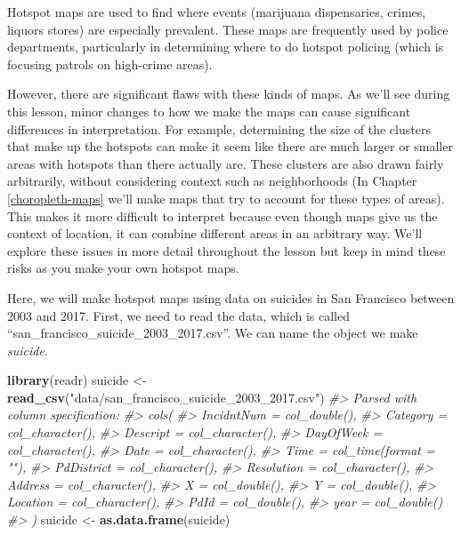 \documentclass[
  12pt,
]{book}
\newenvironment{Shaded}{\begin{snugshade}}{\end{snugshade}}
\newcommand{\CommentTok}[1]{\textcolor[rgb]{0.37,0.37,0.37}{\textit{#1}}}
\newcommand{\KeywordTok}[1]{\textcolor[rgb]{0.27,0.27,0.27}{\textbf{#1}}}
\newcommand{\NormalTok}[1]{#1}
\newcommand{\StringTok}[1]{\textcolor[rgb]{0.5,0.5,0.5}{#1}}
\begin{document}
Hotspot maps are used to find where events (marijuana dispensaries, crimes, liquors stores) are especially prevalent. These maps are frequently used by police departments, particularly in determining where to do hotspot policing (which is focusing patrols on high-crime areas).

However, there are significant flaws with these kinds of maps. As we'll see during this lesson, minor changes to how we make the maps can cause significant differences in interpretation. For example, determining the size of the clusters that make up the hotspots can make it seem like there are much larger or smaller areas with hotspots than there actually are. These clusters are also drawn fairly arbitrarily, without considering context such as neighborhoods (In Chapter \ref{choropleth-maps} we'll make maps that try to account for these types of areas). This makes it more difficult to interpret because even though maps give us the context of location, it can combine different areas in an arbitrary way. We'll explore these issues in more detail throughout the lesson but keep in mind these risks as you make your own hotspot maps.

Here, we will make hotspot maps using data on suicides in San Francisco between 2003 and 2017. First, we need to read the data, which is called ``san\_francisco\_suicide\_2003\_2017.csv''. We can name the object we make \emph{suicide}.

\begin{Shaded}
\begin{Highlighting}[]
\KeywordTok{library}\NormalTok{(readr)}
\NormalTok{suicide <{-}}\StringTok{ }\KeywordTok{read\_csv}\NormalTok{(}\StringTok{"data/san\_francisco\_suicide\_2003\_2017.csv"}\NormalTok{)}
\CommentTok{\#> Parsed with column specification:}
\CommentTok{\#> cols(}
\CommentTok{\#>   IncidntNum = col\_double(),}
\CommentTok{\#>   Category = col\_character(),}
\CommentTok{\#>   Descript = col\_character(),}
\CommentTok{\#>   DayOfWeek = col\_character(),}
\CommentTok{\#>   Date = col\_character(),}
\CommentTok{\#>   Time = col\_time(format = ""),}
\CommentTok{\#>   PdDistrict = col\_character(),}
\CommentTok{\#>   Resolution = col\_character(),}
\CommentTok{\#>   Address = col\_character(),}
\CommentTok{\#>   X = col\_double(),}
\CommentTok{\#>   Y = col\_double(),}
\CommentTok{\#>   Location = col\_character(),}
\CommentTok{\#>   PdId = col\_double(),}
\CommentTok{\#>   year = col\_double()}
\CommentTok{\#> )}
\NormalTok{suicide <{-}}\StringTok{ }\KeywordTok{as.data.frame}\NormalTok{(suicide)}
\end{Highlighting}
\end{Shaded}
\end{document}
